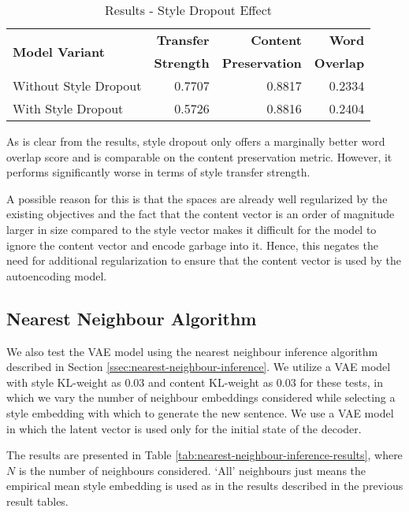 \begin{table}[ht]
	\centering
	\begin{tabular}{| l | r | r | r |}
		\hline
		\multirow{2}{*}{
		\textbf{Model Variant}} & \textbf{Transfer} & \textbf{Content}      & \textbf{Word}    \\
		                        & \textbf{Strength} & \textbf{Preservation} & \textbf{Overlap} \\
		\hline
		\hline
		Without Style Dropout   & 0.7707            & 0.8817                & 0.2334           \\
		\hline
		With Style Dropout      & 0.5726            & 0.8816                & 0.2404           \\
		\hline
	\end{tabular}
	\caption{Results - Style Dropout Effect}
	\label{tab:style-dropout-results}
\end{table}

As is clear from the results, style dropout only offers a marginally better word overlap score and is comparable on the content preservation metric. However, it performs significantly worse in terms of style transfer strength.

A possible reason for this is that the spaces are already well regularized by the existing objectives and the fact that the content vector is an order of magnitude larger in size compared to the style vector makes it difficult for the model to ignore the content vector and encode garbage into it. Hence, this negates the need for additional regularization to ensure that the content vector is used by the autoencoding model.

\subsection{Nearest Neighbour Algorithm}

We also test the VAE model using the nearest neighbour inference algorithm described in Section \ref{ssec:nearest-neighbour-inference}. We utilize a VAE model with style KL-weight as $0.03$ and content KL-weight as $0.03$ for these tests, in which we vary the number of neighbour embeddings considered while selecting a style embedding with which to generate the new sentence. We use a VAE model in which the latent vector is used only for the initial state of the decoder.

The results are presented in Table \ref{tab:nearest-neighbour-inference-results}, where $N$ is the number of neighbours considered. `All' neighbours just means the empirical mean style embedding is used as in the results described in the previous result tables.

